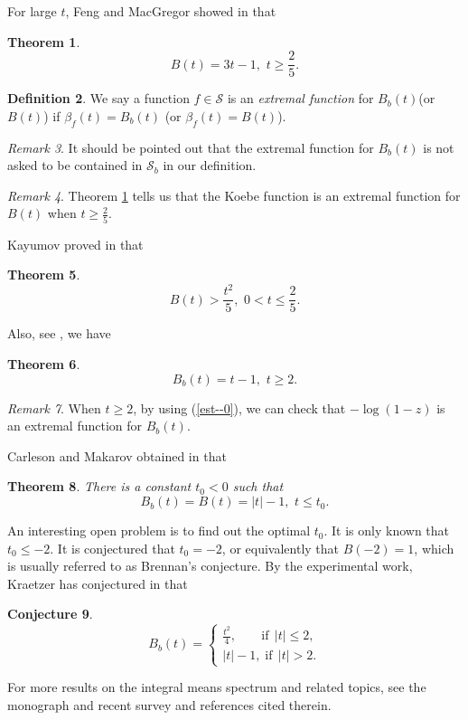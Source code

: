 \documentclass[11pt]{amsart}
\newtheorem{theorem}{Theorem}[section]
\theoremstyle{remark}
\newtheorem{remark}[theorem]{Remark}
\theoremstyle{claim}
\theoremstyle{definition}
\newtheorem{definition}[theorem]{Definition}
\theoremstyle{problem}
\theoremstyle{conjecture}
\newtheorem{conjecture}[theorem]{Conjecture}
\theoremstyle{question}
\numberwithin{equation}{section}
\begin{document}
For large $t$, Feng and MacGregor showed in \cite{FM}  that
\begin{theorem}\label{th-fm}$$
B(t)=3t-1,\,\, t\geq \frac{2}{5}.$$
\end{theorem}
\begin{definition}We say a function $f\in \mathcal{S}$ is an {\em extremal function} for $B_b(t)$(or $B(t)$) if $\beta_f(t)=B_b(t)$ (or $\beta_f(t)=B(t)$).\end{definition}
\begin{remark} It should be pointed out that the extremal function for $B_b(t)$ is not asked to be contained in $\mathcal{S}_b$ in our definition.\end{remark}
\begin{remark}
Theorem \ref{th-fm} tells us that the Koebe function is an extremal function for $B(t)$ when $t\geq \frac{2}{5}$.
\end{remark}

Kayumov proved in \cite{Kay} that
\begin{theorem}
$$ B(t)>\frac{t^2}{5},\,\, 0<t\leq\frac{2}{5}.$$
\end{theorem}

Also, see \cite{Po-2},  we have\begin{theorem}$$
B_b(t)=t-1,\,\, t\geq 2.$$
\end{theorem}
\begin{remark}
When $t\geq2$, by using (\ref{est--0}), we can check that $-\log (1-z)$ is an extremal function for $B_b(t)$.
\end{remark}

Carleson and Makarov obtained in \cite{CM} that
\begin{theorem}\label{CM}
There is a constant $t_0<0$ such that
$$ B_b(t)=B(t)=|t|-1,\,\, t\leq t_0.$$
\end{theorem}
An interesting open problem is to find out the optimal $t_0$. It is only known that $t_0\leq -2$.
It is conjectured that $t_0=-2$, or equivalently that $B(-2)=1$, which is usually referred to as Brennan's conjecture. By the experimental work, Kraetzer has conjectured in \cite{K} that
\begin{conjecture}
\begin{equation}B_b(t)=\begin{cases}
\frac{t^2}{4}, \;\; \; \;\; \;  \;  {\textrm{if}} \;\, |t| \leq 2, \\
|t|-1, \; {\textrm{if}} \;\, |t|>2.
\end{cases}\nonumber
\end{equation}
\end{conjecture}
For more results on the integral means spectrum and related topics, see the monograph \cite{GM} and recent survey \cite{HSo} and references cited therein.
\end{document}

